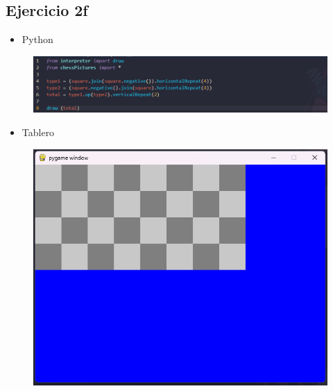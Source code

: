 \documentclass{article}
\begin{document}
	\subsection{Ejercicio 2f}
	\begin{itemize}
		\item Python
	\end{itemize}
	\begin{figure}[H]
		\centering
		\includegraphics[width=1.0\textwidth, keepaspectratio]{img/ejercicio2f}
	\end{figure}
	\begin{itemize}
		\item Tablero
	\end{itemize}
	\begin{figure}[H]
		\centering
		\includegraphics[width=1.0\textwidth, keepaspectratio]{img/ejercicio2ff}
	\end{figure}
	
\end{document}
